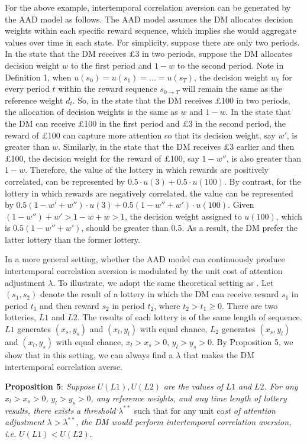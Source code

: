 \documentclass[
  12pt,
]{article}
\begin{document}
For the above example, intertemporal correlation aversion can be
generated by the AAD model as follows. The AAD model assumes the DM
allocates decision weights within each specific reward sequence, which
implies she would aggregate values over time in each state. For
simplicity, suppose there are only two periods. In the state that the DM
receives £3 in two periods, suppose the DM allocates decision weight
\(w\) to the first period and \(1-w\) to the second period. Note in
Definition 1, when \(u(s_0)=u(s_1)=...=u(s_T)\), the decision weight
\(w_t\) for every period \(t\) within the reward sequence
\(s_{0\rightarrow T}\) will remain the same as the reference weight
\(d_t\). So, in the state that the DM receives £100 in two periods, the
allocation of decision weights is the same as \(w\) and \(1-w\). In the
state that the DM can receive £100 in the first period and £3 in the
second period, the reward of £100 can capture more attention so that its
decision weight, say \(w'\), is greater than \(w\). Similarly, in the
state that the DM receives £3 earlier and then £100, the decision weight
for the reward of £100, say \(1-w''\), is also greater than \(1-w\).
Therefore, the value of the lottery in which rewards are positively
correlated, can be represented by \(0.5\cdot u(3)+0.5\cdot u(100)\). By
contrast, for the lottery in which rewards are negatively correlated,
the value can be represented by
\(0.5(1-w'+w'')\cdot u(3)+0.5(1-w''+w')\cdot u(100)\). Given
\((1-w'')+w'>1-w+w>1\), the decision weight assigned to \(u(100)\),
which is \(0.5(1-w''+w')\), should be greater than 0.5. As a result, the
DM prefer the latter lottery than the former lottery.

In a more general setting, whether the AAD model can continuously
produce intertemporal correlation aversion is modulated by the unit cost
of attention adjustment \(\lambda\). To illustrate, we adopt the same
theoretical setting as \citet{bommier2005risk}. Let \((s_1,s_2)\) denote
the result of a lottery in which the DM can receive reward \(s_1\) in
period \(t_1\) and then reward \(s_2\) in period \(t_2\), where
\(t_2>t_1\geq 0\). There are two lotteries, \(L1\) and \(L2\). The
results of each lottery is of the same length of sequence. \(L1\)
generates \((x_s,y_s)\) and \((x_l,y_l)\) with equal chance, \(L_2\)
generates \((x_s,y_l)\) and \((x_l,y_s)\) with equal chance,
\(x_l>x_s>0\), \(y_l>y_s>0\). By Proposition 5, we show that in this
setting, we can always find a \(\lambda\) that makes the DM
intertemporal correlation averse.

\noindent \textbf{Proposition 5}: \emph{Suppose} \(U(L1), U(L2)\)
\emph{are the values of} \(L1\) \emph{and} \(L2\)\emph{. For any}
\(x_l>x_s>0\)\emph{,} \(y_l>y_s>0\)\emph{, any reference weights, and
any time length of lottery results, there exists} \emph{a threshold}
\(\lambda^{**}\) such that for any unit co\emph{st of attention
adjustment} \(\lambda>\lambda^{**}\), \emph{the DM would perform
intertemporal correlation aversion, i.e.} \(U(L1)<U(L2)\).
\end{document}
